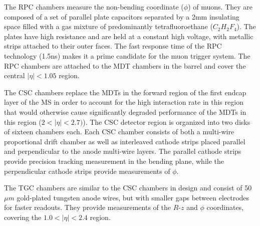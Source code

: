 The RPC chambers measure the non-bending coordinate ($\phi$) of muons.
They are composed of a set of parallel plate capacitors separated by a 2mm insulating space filled with a gas mixture of predominantly tetrafluoroethane ($C_2 H_2 F_4$). 
The plates have high resistance and are held at a constant high voltage, with metallic strips attached to their outer faces.
The fast response time of the RPC technology (1.5ns) makes it a prime candidate for the muon trigger system.
The RPC chambers are attached to the MDT chambers in the barrel and cover the central $|\eta| < 1.05$ region.

The CSC chambers replace the MDTs in the forward region of the first endcap layer of the MS in order to account for the high interaction rate in this region that would otherwise cause significantly degraded performance of the MDTs in this region ($2 < |\eta| < 2.7)$).
The CSC detector region is organized into two disks of sixteen chambers each.
Each CSC chamber consists of both a multi-wire proportional drift chamber as well as interleaved cathode strips placed parallel and perpendicular to the anode multi-wire layers.
The parallel cathode strips provide precision tracking measurement in the bending plane, while the perpendicular cathode strips provide measurements of $\phi$.

The TGC chambers are similar to the CSC chambers in design and consist of 50 $\mu m$ gold-plated tungsten anode wires, but with smaller gaps between electrodes for faster readouts.
They provide measurements of the $R$-$z$ and $\phi$ coordinates, covering the $1.0 < |\eta| < 2.4$ region.


% 
